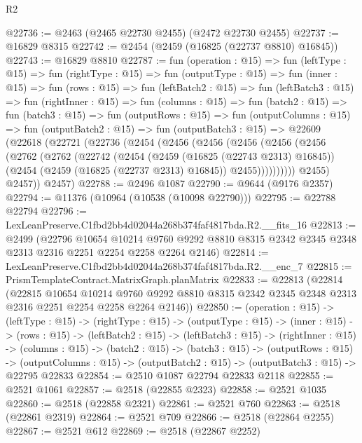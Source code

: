 \begin{lexlean}{R2}
\begin{coremodule}
@22736 := @2463 (@2465 @22730 @2455) (@2472 @22730 @2455)
@22737 := @16829 @8315
@22742 := @2454 (@2459 (@16825 (@22737 @8810) @16845))
@22743 := @16829 @8810
@22787 := fun (operation : @15) =>
  fun (leftType : @15) =>
  fun (rightType : @15) =>
  fun (outputType : @15) =>
  fun (inner : @15) =>
  fun (rows : @15) =>
  fun (leftBatch2 : @15) =>
  fun (leftBatch3 : @15) =>
  fun (rightInner : @15) =>
  fun (columns : @15) =>
  fun (batch2 : @15) =>
  fun (batch3 : @15) =>
  fun (outputRows : @15) =>
  fun (outputColumns : @15) =>
  fun (outputBatch2 : @15) =>
  fun (outputBatch3 : @15) =>
  @22609
    (@22618
      (@22721
        (@22736
          (@2454
            (@2456
              (@2456
                (@2456
                  (@2456
                    (@2456
                      (@2762
                        (@2762
                          (@22742
                            (@2454
                              (@2459 (@16825 (@22743 @2313) @16845))
                              (@2454 (@2459 (@16825 (@22737 @2313) @16845)) @2455))))))))))
            @2455)
          @2457))
      @2457)
@22788 := @2496 @1087
@22790 := @9644 (@9176 @2357)
@22794 := @11376 (@10964 (@10538 (@10098 @22790)))
@22795 := @22788 @22794
@22796 := LexLeanPreserve.C1fbd2bb4d02044a268b374faf4817bda.R2.__fits_16
@22813 := @2499
    (@22796
      @10654
      @10214
      @9760
      @9292
      @8810
      @8315
      @2342
      @2345
      @2348
      @2313
      @2316
      @2251
      @2254
      @2258
      @2264
      @2146)
@22814 := LexLeanPreserve.C1fbd2bb4d02044a268b374faf4817bda.R2.__enc_7
@22815 := PrismTemplateContract.MatrixGraph.planMatrix
@22833 := @22813
    (@22814
      (@22815
        @10654
        @10214
        @9760
        @9292
        @8810
        @8315
        @2342
        @2345
        @2348
        @2313
        @2316
        @2251
        @2254
        @2258
        @2264
        @2146))
@22850 := (operation : @15) ->
  (leftType : @15) ->
  (rightType : @15) ->
  (outputType : @15) ->
  (inner : @15) ->
  (rows : @15) ->
  (leftBatch2 : @15) ->
  (leftBatch3 : @15) ->
  (rightInner : @15) ->
  (columns : @15) ->
  (batch2 : @15) ->
  (batch3 : @15) ->
  (outputRows : @15) ->
  (outputColumns : @15) -> (outputBatch2 : @15) -> (outputBatch3 : @15) -> @22795 @22833
@22854 := @2510 @1087 @22794 @22833 @2118
@22855 := @2521 @1061
@22857 := @2518 (@22855 @2323)
@22858 := @2521 @1035
@22860 := @2518 (@22858 @2321)
@22861 := @2521 @760
@22863 := @2518 (@22861 @2319)
@22864 := @2521 @709
@22866 := @2518 (@22864 @2255)
@22867 := @2521 @612
@22869 := @2518 (@22867 @2252)

\end{coremodule}
\end{lexlean}
